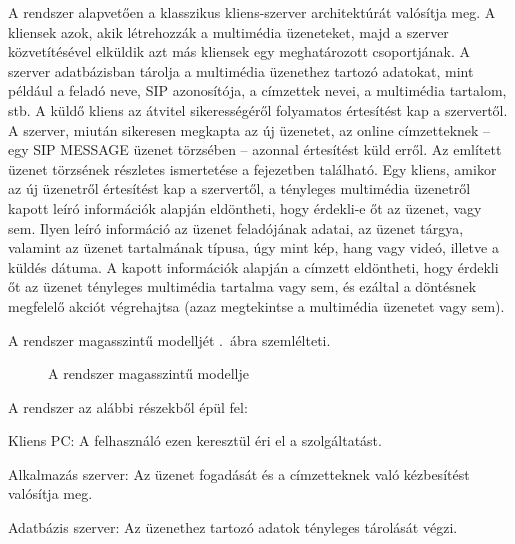 A rendszer alapvetően a klasszikus kliens-szerver architektúrát valósítja meg. A kliensek azok, akik létrehozzák a multimédia üzeneteket, majd a szerver köz\-ve\-tí\-té\-sé\-vel elküldik azt más kliensek egy meghatározott csoportjának. A szerver adatbázisban tárolja a multimédia üzenethez tartozó adatokat, mint például a feladó neve, SIP azonosítója, a címzettek nevei, a multimédia tartalom, stb. A küldő kliens az átvitel si\-ke\-res\-sé\-gé\-ről folyamatos értesítést kap a szervertől. A szerver, miután sikeresen megkapta az új üzenetet, az online címzetteknek -- egy SIP MESSAGE üzenet törzsében -- azonnal értesítést küld erről. Az említett üzenet törzsének részletes ismertetése a  fejezetben található. Egy kliens, amikor az új üzenetről értesítést kap a szervertől, a tényleges multimédia üzenetről kapott leíró információk alapján eldöntheti, hogy érdekli-e őt az üzenet, vagy sem. Ilyen leíró információ az üzenet feladójának adatai, az üzenet tárgya, valamint az üzenet tartalmának típusa, úgy mint kép, hang vagy videó, illetve a küldés dátuma. A kapott információk alapján a címzett eldöntheti, hogy érdekli őt az üzenet tényleges multimédia tartalma vagy sem, és ezáltal a döntésnek megfelelő akciót végrehajtsa (azaz megtekintse a multimédia üzenetet vagy sem). 

A rendszer magasszintű modelljét .~ábra szemlélteti.

\begin{figure}[htbp]
\center
{}
\caption{A rendszer magasszintű modellje}
\label{fig:model}
\end{figure}

A rendszer az alábbi részekből épül fel:
\begin{mydescription}
\item[Kliens PC:] A felhasználó ezen keresztül éri el a szolgáltatást.
\item[Alkalmazás szerver:] Az üzenet fogadását és a címzetteknek való kézbesítést valósítja meg.
\item[Adatbázis szerver:] Az üzenethez tartozó adatok tényleges tárolását végzi.
\end{mydescription}

